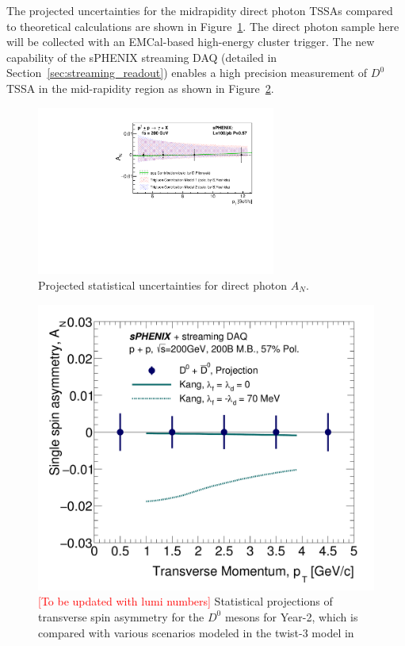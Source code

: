 The projected uncertainties for the midrapidity direct photon TSSAs compared to theoretical calculations are shown in Figure~\ref{fig:AN_dp}. The direct photon sample here will be collected with an EMCal-based high-energy cluster trigger. 
The new capability of the sPHENIX streaming DAQ (detailed in
Section~\ref{sec:streaming_readout}) enables a high precision
measurement of $D^0$ TSSA in the mid-rapidity region as shown in
Figure~\ref{fig:AN-D0year20232025}. 

\begin{figure}[htbp]
\centering
\includegraphics[width=0.70\textwidth]{figs/AN_dp_sphenix.pdf}
\caption{Projected statistical uncertainties for direct photon $A_N$.}
\label{fig:AN_dp}
\end{figure}

\begin{figure}[htbp]
\begin{center}
\includegraphics[width=.49\linewidth]{figs/RAA_DB_theory_root_AN_D0D0bar_pp200B.pdf}
\caption{{\textcolor{red}{[To be updated with lumi numbers]}} Statistical projections of
  transverse spin asymmetry for the $D^0$ mesons for Year-2, which is compared with various scenarios modeled in the twist-3 model in~\cite{Kang:2008ih}} 
\label{fig:AN-D0year20232025}
\end{center}
\end{figure}

